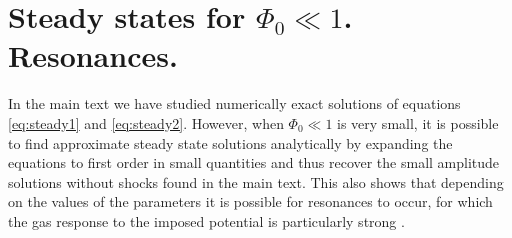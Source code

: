 \documentclass[useAMS,usenatbib]{mn2e}
\begin{document}
\section{Steady states for $\Phi_0\ll1$. Resonances.}

In the main text we have studied numerically exact solutions of equations \eqref{eq:steady1} and \eqref{eq:steady2}. However, when $\Phi_0\ll1$ is very small, it is possible to find approximate steady state solutions analytically by expanding the equations to first order in small quantities and thus recover the small amplitude solutions without shocks found in the main text. This also shows that depending on the values of the parameters it is possible for resonances to occur, for which the gas response to the imposed potential is particularly strong \citep{Shu+1973}.
\end{document}
